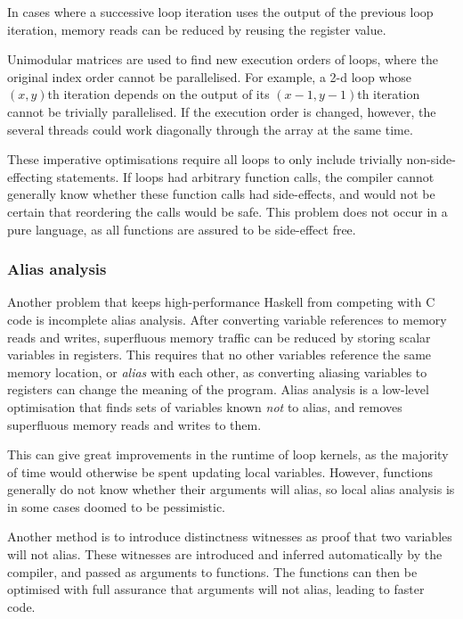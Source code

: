 In cases where a successive loop iteration uses the output of the previous loop iteration, memory reads can be reduced by reusing the register value\cite{wang2013loop}.

Unimodular matrices are used to find new execution orders of loops, where the original index order cannot be parallelised\cite{banerjee1993loop}.
For example, a 2-d loop whose $(x,y)$th iteration depends on the output of its $(x-1,y-1)$th iteration cannot be trivially parallelised.
If the execution order is changed, however, the several threads could work diagonally through the array at the same time.

These imperative optimisations require all loops to only include trivially non-side-effecting statements.
If loops had arbitrary function calls, the compiler cannot generally know whether these function calls had side-effects,
and would not be certain that reordering the calls would be safe.
This problem does not occur in a pure language, as all functions are assured to be side-effect free.


\subsubsection{Alias analysis}

Another problem that keeps high-performance Haskell from competing with C code is incomplete alias analysis.
After converting variable references to memory reads and writes, superfluous memory traffic can be reduced by storing scalar variables in registers.
This requires that no other variables reference the same memory location, or \emph{alias} with each other,
as converting aliasing variables to registers can change the meaning of the program.
Alias analysis is a low-level optimisation that finds sets of variables known \emph{not} to alias, and removes superfluous memory reads and writes to them.

This can give great improvements in the runtime of loop kernels, as the majority of time would otherwise be spent updating local variables\cite{clifton2012optimisations}.
However, functions generally do not know whether their arguments will alias, so local alias analysis is in some cases doomed to be pessimistic.

Another method is to introduce distinctness witnesses\cite{ma2012type} as proof that two variables will not alias.
These witnesses are introduced and inferred automatically by the compiler, and passed as arguments to functions.
The functions can then be optimised with full assurance that arguments will not alias, leading to faster code.

